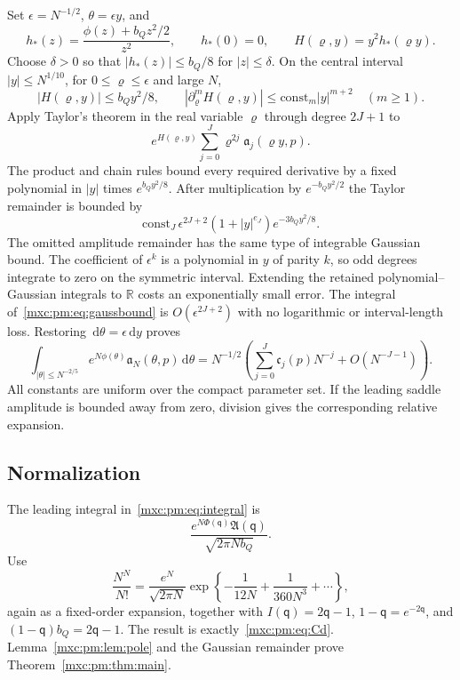 \documentclass[11pt]{article}
\numberwithin{equation}{section}
\theoremstyle{definition}
\theoremstyle{remark}
\newcommand{\dd}{\,\mathrm d}
\begin{document}
Set $\epsilon=N^{-1/2}$, $\theta=\epsilon y$, and
\[
 h_*(z)=\frac{\phi(z)+b_Qz^2/2}{z^2},\qquad h_*(0)=0,
 \qquad H(\varrho,y)=y^2h_*(\varrho y).
\]
Choose $\delta>0$ so that $|h_*(z)|\le b_Q/8$ for $|z|\le\delta$. On the
central interval $|y|\le N^{1/10}$, for $0\le\varrho\le\epsilon$ and large
$N$,
\[
 |H(\varrho,y)|\le b_Qy^2/8,\qquad
 |\partial_\varrho^mH(\varrho,y)|\le\mathrm{const}_m|y|^{m+2}\quad(m\ge1).
\]
Apply Taylor's theorem in the real variable $\varrho$ through degree $2J+1$ to
\[
 e^{H(\varrho,y)}\sum_{j=0}^J\varrho^{2j}\mathfrak a_j(\varrho y,p).
\]
The product and chain rules bound every required derivative by a fixed
polynomial in $|y|$ times $e^{b_Qy^2/8}$. After multiplication by
$e^{-b_Qy^2/2}$ the Taylor remainder is bounded by
\begin{equation}\label{mxc:pm:eq:gaussbound}
 \mathrm{const}_J\,\epsilon^{2J+2}(1+|y|^{e_J})e^{-3b_Qy^2/8}.
\end{equation}
The omitted amplitude remainder has the same type of integrable Gaussian
bound. The coefficient of $\epsilon^k$ is a polynomial in $y$ of parity $k$,
so odd degrees integrate to zero on the symmetric interval. Extending the
retained polynomial--Gaussian integrals to $\mathbb R$ costs an exponentially
small error. The integral of~\eqref{mxc:pm:eq:gaussbound} is
$O(\epsilon^{2J+2})$ with no logarithmic or interval-length loss. Restoring
$\dd\theta=\epsilon\dd y$ proves
\[
 \int_{|\theta|\le N^{-2/5}} e^{N\phi(\theta)}\mathfrak a_N(\theta,p)\dd\theta
 =N^{-1/2}\left(\sum_{j=0}^J\mathfrak c_j(p)N^{-j}
                     +O(N^{-J-1})\right).
\]
All constants are uniform over the compact parameter set. If the leading
saddle amplitude is bounded away from zero, division gives the corresponding
relative expansion.

\subsection{Normalization}
The leading integral in~\eqref{mxc:pm:eq:integral} is
\[
 \frac{e^{N\Phi(\mathsf q)}\mathfrak A(\mathsf q)}{\sqrt{2\pi Nb_Q}}.
\]
Use
\[
 \frac{N^N}{N!}=\frac{e^N}{\sqrt{2\pi N}}
 \exp\left\{-\frac1{12N}+\frac1{360N^3}+\cdots\right\},
\]
again as a fixed-order expansion, together with $I(\mathsf q)=2\mathsf q-1$,
$1-\mathsf q=e^{-2\mathsf q}$, and $(1-\mathsf q)b_Q=2\mathsf q-1$. The result
is exactly~\eqref{mxc:pm:eq:Cd}. Lemma~\ref{mxc:pm:lem:pole} and the Gaussian
remainder prove Theorem~\ref{mxc:pm:thm:main}.
\end{document}
